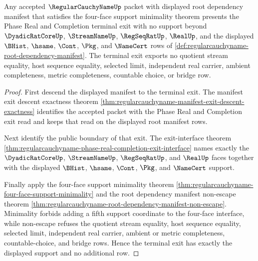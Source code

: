 \begin{theorem}
\label{thm:regularcauchyname-terminal-exit-no-extra-support}
Any accepted $\RegularCauchyNameUp$ packet with displayed root dependency manifest that satisfies the four-face support minimality theorem presents the Phase Real and Completion terminal exit with no support beyond $\DyadicRatCoreUp$, $\StreamNameUp$, $\RegSeqRatUp$, $\RealUp$, and the displayed $\BHist$, $\hsame$, $\Cont$, $\Pkg$, and $\NameCert$ rows of \autoref{def:regularcauchyname-root-dependency-manifest}. The terminal exit exports no quotient stream equality, host sequence equality, selected limit, independent real carrier, ambient completeness, metric completeness, countable choice, or bridge row.
\end{theorem}
\begin{proof}
First descend the displayed manifest to the terminal exit. The manifest exit descent exactness theorem \autoref{thm:regularcauchyname-manifest-exit-descent-exactness} identifies the accepted packet with the Phase Real and Completion exit read and keeps that read on the displayed root manifest rows.

Next identify the public boundary of that exit. The exit-interface theorem \autoref{thm:regularcauchyname-phase-real-completion-exit-interface} names exactly the $\DyadicRatCoreUp$, $\StreamNameUp$, $\RegSeqRatUp$, and $\RealUp$ faces together with the displayed $\BHist$, $\hsame$, $\Cont$, $\Pkg$, and $\NameCert$ support.

Finally apply the four-face support minimality theorem \autoref{thm:regularcauchyname-four-face-support-minimality} and the root dependency manifest non-escape theorem \autoref{thm:regularcauchyname-root-dependency-manifest-non-escape}. Minimality forbids adding a fifth support coordinate to the four-face interface, while non-escape refuses the quotient stream equality, host sequence equality, selected limit, independent real carrier, ambient or metric completeness, countable-choice, and bridge rows. Hence the terminal exit has exactly the displayed support and no additional row.
\end{proof}













